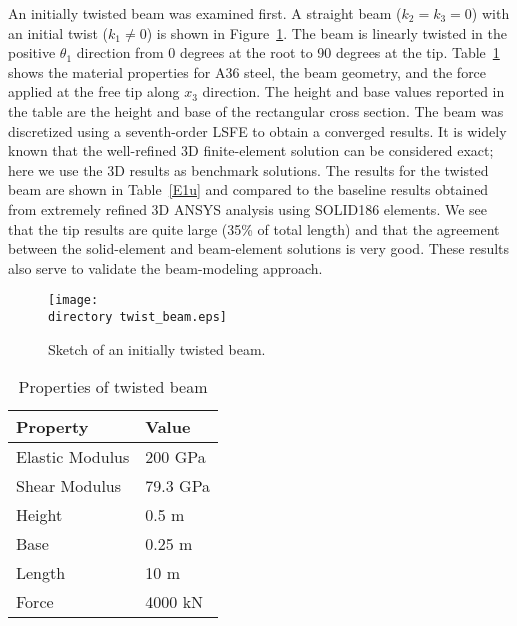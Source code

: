 \documentclass{aiaa-tc}
\def\directory{EPSF/}
\begin{document}
An initially twisted beam was examined first. A straight beam ($k_2=k_3=0$) with an initial twist ($k_1\neq 0$) is shown in Figure~\ref{Twist1}. The beam is linearly twisted in the positive $\theta_1$ direction from 0 degrees at the root to 90 degrees at the tip. Table~\ref{E1Property} shows the material properties for A36 steel, the beam geometry, and the force applied at the free tip along $x_3$ direction. The height and base values reported in the table are the height and base of the rectangular cross section. The beam was discretized using a seventh-order LSFE to obtain a converged results. It is widely known that the well-refined 3D finite-element solution can be considered exact; here we use the 3D results as benchmark solutions. The results for the twisted beam are shown in Table~\ref{E1u} and compared to the baseline results obtained from extremely refined 3D ANSYS analysis using SOLID186 elements. We see that the tip results are quite large (35\% of total length) and that the agreement between the solid-element and beam-element solutions is very good.  These results also serve to validate the beam-modeling approach.

\begin{figure}
\centering
\texttt{[image: \\directory twist\_beam.eps]}
\caption{Sketch of an initially twisted beam.} 
\label{Twist1}
\end{figure}

 \begin{table}
\caption{\label{E1Property} Properties of twisted beam}
\begin{center}
    \begin{tabular}{| l | l |}
    	\hline
    	Property               & Value   \\ \hline
    	Elastic Modulus                      & 200 GPa \\ \hline
    	Shear Modulus                      & 79.3 GPa \\ \hline
    	Height                      & 0.5 m   \\ \hline
    	Base                      & 0.25 m  \\ \hline
    	Length                      & 10 m    \\ \hline
    	Force                      & 4000 kN \\ \hline
    \end{tabular}
\end{center}
\end{table}
\end{document}
